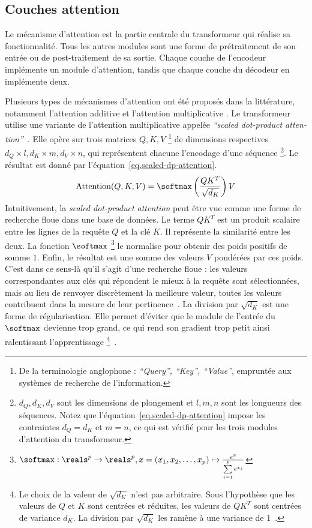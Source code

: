 \subsection{Couches attention}

Le mécanisme d'attention est la partie centrale du transformeur qui réalise sa fonctionnalité.
Tous les autres modules sont une forme de prétraitement de son entrée ou de post-traitement de sa sortie. 
Chaque couche de l'encodeur implémente un module d'attention, 
tandis que chaque couche du décodeur en implémente deux.

Plusieurs types de mécanismes d'attention ont été proposés dans la littérature,
notamment l'attention additive \cite{Bahdanau_Cho_Bengio_2016} 
et l'attention multiplicative \cite{Luong_Pham_Manning_2015}.
Le transformeur utilise une variante de l'attention multiplicative appelée 
\foreignlanguage{english}{\emph{``scaled dot-product attention''}}~\cite{attention}.
Elle opère sur trois matrices \(Q, K, V\)%
\footnote{%
    De la terminologie anglophone : \foreignlanguage{english}{\emph{``Query'', ``Key'', ``Value''}},
    empruntée aux systèmes de recherche de l'information.
} de dimensions respectives \(d_Q \times l, d_K \times m, d_V \times n\),
qui représentent chacune l'encodage d'une séquence%
\footnote{
    \(d_Q, d_K, d_V\) sont les dimensions de plongement et \(l, m, n\) sont les longueurs des séquences.
    Notez que l'équation~\eqref{eq.scaled-dp-attention} impose les contraintes \(d_Q = d_K\) et \(m = n\),
    ce qui est vérifié pour les trois modules d'attention du transformeur.
}.
Le résultat est donné par l'équation~\eqref{eq.scaled-dp-attention}.
\begin{eqnarray}
    \label{eq.scaled-dp-attention}
    \text{Attention}(Q, K, V) = \softmax\left(\frac{QK^T}{\sqrt{d_K}}\right)V 
\end{eqnarray}
Intuitivement, la \emph{\foreignlanguage{english}{scaled dot-product attention}} peut être vue comme 
une forme de recherche floue dans une base de données.
Le terme \(QK^T\) est un produit scalaire entre les lignes de la requête \(Q\) et la clé \(K\).
Il représente la similarité entre les deux.
La fonction \(\softmax\)%
\footnote{%
    \(\softmax : \reals^p \to \reals^p, x = (x_1, x_2, \ldots, x_p) \mapsto
    \frac{ e^x}{\sum\limits_{i=1}^p e^{x_i}}\)
} %
le normalise pour obtenir des poids positifs de somme \(1\).
Enfin, le résultat est une somme des valeurs \(V\) pondérées par ces poids.
C'est dans ce sens-là qu'il s'agit d'une recherche floue :
les valeurs correspondantes aux clés qui répondent le mieux à la requête sont sélectionnées,
mais au lieu de renvoyer discrètement la meilleure valeur, 
toutes les valeurs contribuent dans la mesure de leur pertinence~\cite{CS480/680Lecture19_2019}.
La division par \(\sqrt{d_K}\) est une forme de régularisation. 
Elle permet d'éviter que le module de l'entrée du \(\softmax\) devienne trop grand,
ce qui rend son gradient trop petit ainsi ralentissant l'apprentissage%
\footnote{%
    Le choix de la valeur de \(\sqrt{d_K}\) n'est pas arbitraire.
    Sous l'hypothèse que les valeurs de \(Q\) et \(K\) sont centrées et réduites,
    les valeurs de \(QK^T\) sont centrées de variance \(d_K\).
    La division par \(\sqrt{d_K}\) les ramène à une variance de \(1\)~\cite{attention}.
}~\cite{attention}.

